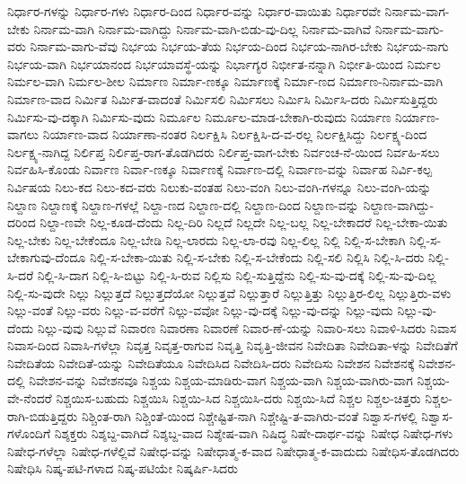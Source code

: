 {ನಿರ್ಧಾರ-ಗಳನ್ನು
ನಿರ್ಧಾರ-ಗಳು
ನಿರ್ಧಾರ-ದಿಂದ
ನಿರ್ಧಾರ-ವನ್ನು
ನಿರ್ಧಾರ-ವಾಯಿತು
ನಿರ್ಧಾರವೇ
ನಿರ್ನಾಮ-ವಾಗ-ಬೇಕು
ನಿರ್ನಾಮ-ವಾಗಿ
ನಿರ್ನಾಮ-ವಾಗಿದ್ದು
ನಿರ್ನಾಮ-ವಾಗಿ-ಬಿಡು-ವು-ದಿಲ್ಲ
ನಿರ್ನಾಮ-ವಾಗಿವೆ
ನಿರ್ನಾಮ-ವಾಗು-ವರು
ನಿರ್ನಾಮ-ವಾಗು-ವೆವು
ನಿರ್ಭಯ
ನಿರ್ಭಯ-ತೆಯ
ನಿರ್ಭಯ-ದಿಂದ
ನಿರ್ಭಯ-ನಾಗಿರ-ಬೇಕು
ನಿರ್ಭಯ-ನಾಗು
ನಿರ್ಭಯ-ವಾಗಿ
ನಿರ್ಭಯಾನಂದ
ನಿರ್ಭಯಾವಸ್ಥೆ-ಯನ್ನು
ನಿರ್ಭಾಗ್ಯರ
ನಿರ್ಭೀತ-ನನ್ನಾಗಿ
ನಿರ್ಭೀತಿ-ಯಿಂದ
ನಿರ್ಮಲ
ನಿರ್ಮಲ-ವಾಗಿ
ನಿರ್ಮಲ-ಶೀಲ
ನಿರ್ಮಾಣ
ನಿರ್ಮಾ-ಣಕ್ಕೂ
ನಿರ್ಮಾಣಕ್ಕೆ
ನಿರ್ಮಾ-ಣದ
ನಿರ್ಮಾಣ-ನಿರ್ನಾಮ-ವಾಗಿ
ನಿರ್ಮಾಣ-ವಾದ
ನಿರ್ಮಿತ
ನಿರ್ಮಿತ-ವಾದಂತೆ
ನಿರ್ಮಿಸಲಿ
ನಿರ್ಮಿಸಲು
ನಿರ್ಮಿಸಿ
ನಿರ್ಮಿಸಿ-ದರು
ನಿರ್ಮಿಸುತ್ತಿದ್ದರು
ನಿರ್ಮಿಸು-ವು-ದಕ್ಕಾಗಿ
ನಿರ್ಮಿಸು-ವುದು
ನಿರ್ಮೂಲ
ನಿರ್ಮೂಲ-ಮಾಡ-ಬೇಕಾಗಿ-ರುವುದು
ನಿರ್ಯಾಣ
ನಿರ್ಯಾಣ-ವಾಗಲು
ನಿರ್ಯಾಣ-ವಾದ
ನಿರ್ಯಾಣಾ-ನಂತರ
ನಿರ್ಲಕ್ಷಿಸಿ
ನಿರ್ಲಕ್ಷಿಸಿ-ದ-ವ-ರಲ್ಲ
ನಿರ್ಲಕ್ಷಿಸಿದ್ದು
ನಿರ್ಲಕ್ಷ್ಯ-ದಿಂದ
ನಿರ್ಲಕ್ಷ್ಯ-ನಾಗಿದ್ದ
ನಿರ್ಲಿಪ್ತ
ನಿರ್ಲಿಪ್ತ-ರಾಗ-ತೊಡಗಿದರು
ನಿರ್ಲಿಪ್ತ-ವಾಗ-ಬೇಕು
ನಿರ್ವಂಚ-ನೆ-ಯಿಂದ
ನಿರ್ವಹಿ-ಸಲು
ನಿರ್ವಹಿಸಿ-ಕೊಂಡು
ನಿರ್ವಾಣ
ನಿರ್ವಾ-ಣಕ್ಕೂ
ನಿರ್ವಾಣಕ್ಕೆ
ನಿರ್ವಾಣ-ದಲ್ಲಿ
ನಿರ್ವಾಣ-ವನ್ನು
ನಿರ್ವಾಹ
ನಿರ್ವಿ-ಕಲ್ಪ
ನಿರ್ವಿಷಯ
ನಿಲು-ಕದ
ನಿಲು-ಕದ-ವರು
ನಿಲುಕು-ವಂತಹ
ನಿಲು-ವಂಗಿ
ನಿಲು-ವಂಗಿ-ಗಳನ್ನೂ
ನಿಲು-ವಂಗಿ-ಯನ್ನು
ನಿಲ್ದಾಣ
ನಿಲ್ದಾಣಕ್ಕೆ
ನಿಲ್ದಾಣ-ಗಳಲ್ಲೆ
ನಿಲ್ದಾ-ಣದ
ನಿಲ್ದಾಣ-ದಲ್ಲಿ
ನಿಲ್ದಾಣ-ದಿಂದ
ನಿಲ್ದಾಣ-ವನ್ನು
ನಿಲ್ದಾಣ-ವಾಗಿದ್ದು-ದರಿಂದ
ನಿಲ್ದಾ-ಣವೇ
ನಿಲ್ಲ-ಕೂಡ-ದೆಂದು
ನಿಲ್ಲ-ದಿರಿ
ನಿಲ್ಲದೆ
ನಿಲ್ಲದೇ
ನಿಲ್ಲ-ಬಲ್ಲ
ನಿಲ್ಲ-ಬೇಕಾದರೆ
ನಿಲ್ಲ-ಬೇಕಾ-ಯಿತು
ನಿಲ್ಲ-ಬೇಕು
ನಿಲ್ಲ-ಬೇಕೆಂದೂ
ನಿಲ್ಲ-ಬೇಡಿ
ನಿಲ್ಲ-ಲಾರದು
ನಿಲ್ಲ-ಲಾ-ರವು
ನಿಲ್ಲ-ಲಿಲ್ಲ
ನಿಲ್ಲಿ
ನಿಲ್ಲಿ-ಸ-ಬೇಕಾಗಿ
ನಿಲ್ಲಿ-ಸ-ಬೇಕಾಗುವು-ದೆಂದೂ
ನಿಲ್ಲಿ-ಸ-ಬೇಕಾ-ಯಿತು
ನಿಲ್ಲಿ-ಸ-ಬೇಕು
ನಿಲ್ಲಿ-ಸ-ಬೇಕೆಂದು
ನಿಲ್ಲಿ-ಸಲಿ
ನಿಲ್ಲಿಸಿ
ನಿಲ್ಲಿ-ಸಿ-ದರು
ನಿಲ್ಲಿ-ಸಿ-ದರೆ
ನಿಲ್ಲಿ-ಸಿ-ದಾಗ
ನಿಲ್ಲಿ-ಸಿ-ಬಿಟ್ಟು
ನಿಲ್ಲಿ-ಸಿ-ರುವ
ನಿಲ್ಲಿಸು
ನಿಲ್ಲಿ-ಸುತ್ತಿದ್ದೆನು
ನಿಲ್ಲಿ-ಸು-ವು-ದಕ್ಕೆ
ನಿಲ್ಲಿ-ಸು-ವು-ದಿಲ್ಲ
ನಿಲ್ಲಿ-ಸು-ವುದೇ
ನಿಲ್ಲು
ನಿಲ್ಲುತ್ತದೆ
ನಿಲ್ಲುತ್ತದೆಯೋ
ನಿಲ್ಲುತ್ತವೆ
ನಿಲ್ಲುತ್ತಾರೆ
ನಿಲ್ಲುತ್ತಿತ್ತು
ನಿಲ್ಲುತ್ತಿರ-ಲಿಲ್ಲ
ನಿಲ್ಲುತ್ತಿರು-ವಳು
ನಿಲ್ಲು-ವಂತೆ
ನಿಲ್ಲು-ವರು
ನಿಲ್ಲು-ವ-ವರೆಗೆ
ನಿಲ್ಲು-ವವೋ
ನಿಲ್ಲು-ವು-ದಕ್ಕೆ
ನಿಲ್ಲು-ವು-ದನ್ನು
ನಿಲ್ಲು-ವುದು
ನಿಲ್ಲು-ವು-ದೆಂದು
ನಿಲ್ಲು-ವುವು
ನಿಲ್ಲುವೆ
ನಿವಾರಣ
ನಿವಾರಣಾ
ನಿವಾರಣೆ
ನಿವಾರ-ಣೆ-ಯನ್ನು
ನಿವಾರಿ-ಸಲು
ನಿವಾಳಿ-ಸಿದರು
ನಿವಾಸ
ನಿವಾಸ-ದಿಂದ
ನಿವಾಸಿ-ಗಳೆಲ್ಲಾ
ನಿವೃತ್ತ
ನಿವೃತ್ತ-ರಾಗುವ
ನಿವೃತ್ತಿ
ನಿವೃತ್ತಿ-ಜೀವನ
ನಿವೇದಿತಾ
ನಿವೇದಿತಾ-ಳನ್ನು
ನಿವೇದಿತೆಗೆ
ನಿವೇದಿತೆಯ
ನಿವೇದಿತೆ-ಯನ್ನು
ನಿವೇದಿತೆಯೂ
ನಿವೇದಿಸಿದ
ನಿವೇದಿಸಿ-ದರು
ನಿವೇದಿಸು
ನಿವೇಶನ
ನಿವೇಶನಕ್ಕೆ
ನಿವೇಶನ-ದಲ್ಲಿ
ನಿವೇಶನ-ವನ್ನು
ನಿವೇಶನವೂ
ನಿಶ್ಚಯ
ನಿಶ್ಚಯ-ಮಾಡಿರು-ವಾಗ
ನಿಶ್ಚಯ-ವಾಗಿ
ನಿಶ್ಚಯ-ವಾಗಿರು-ವಾಗ
ನಿಶ್ಚಯ-ವೇ-ನೆಂದರೆ
ನಿಶ್ಚಯಿಸ-ಬಹುದು
ನಿಶ್ಚಯಿಸಿ
ನಿಶ್ಚಯಿ-ಸಿದ
ನಿಶ್ಚಯಿಸಿ-ದರು
ನಿಶ್ಚಯಿ-ಸಿದೆ
ನಿಶ್ಚಲ
ನಿಶ್ಚಲ-ಚಿತ್ತರು
ನಿಶ್ಚಲ-ರಾಗಿ-ಬಿಡುತ್ತಿದ್ದರು
ನಿಶ್ಚಿಂತ-ರಾಗಿ
ನಿಶ್ಚಿಂತೆ-ಯಿಂದ
ನಿಶ್ಚೇಷ್ಟಿತ-ನಾಗಿ
ನಿಶ್ಚೇಷ್ಟಿ-ತ-ವಾಗಿರು-ವಂತೆ
ನಿಶ್ವಾಸ-ಗಳಲ್ಲಿ
ನಿಶ್ವಾಸ-ಗಳೊಂದಿಗೆ
ನಿಶ್ಶಕ್ತರು
ನಿಶ್ಶಬ್ದ-ವಾಗಿದೆ
ನಿಶ್ಶಬ್ದ-ವಾದ
ನಿಶ್ಶೇಷ-ವಾಗಿ
ನಿಷಿದ್ಧ
ನಿಷೇ-ದಾರ್ಥ-ವನ್ನು
ನಿಷೇಧ
ನಿಷೇಧ-ಗಳು
ನಿಷೇಧ-ಗಳೆಲ್ಲಾ
ನಿಷೇಧ-ಗಳೆಲ್ಲಿವೆ
ನಿಷೇಧ-ವನ್ನು
ನಿಷೇಧಾತ್ಮ-ಕ-ವಾದ
ನಿಷೇಧಾತ್ಮ-ಕ-ವಾದುದು
ನಿಷೇಧಿಸ-ತೊಡಗಿದರು
ನಿಷೇಧಿಸಿ
ನಿಷ್ಕ-ಪಟಿ-ಗಳಾದ
ನಿಷ್ಕ-ಪಟಿಯೇ
ನಿಷ್ಕರ್ಷಿ-ಸಿದರು
}
